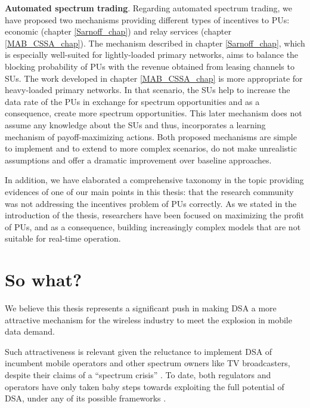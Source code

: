 \textbf{Automated spectrum trading}. Regarding automated spectrum trading, we have proposed two mechanisms providing different types of incentives to PUs: economic (chapter \ref{Sarnoff_chap}) and relay services (chapter \ref{MAB_CSSA_chap}). The mechanism described in chapter \ref{Sarnoff_chap}, which is especially well-suited for lightly-loaded primary networks, aims to balance the blocking probability of PUs with the revenue obtained from leasing channels to SUs. The work developed in chapter \ref{MAB_CSSA_chap} is more appropriate for heavy-loaded primary networks. In that scenario, the SUs help to increase the data rate of the PUs in exchange for spectrum opportunities and as a consequence, create more spectrum opportunities. This later mechanism does not assume any knowledge about the SUs and thus, incorporates a learning mechanism of payoff-maximizing actions. Both proposed mechanisms are simple to implement and to extend to more complex scenarios, do not make unrealistic assumptions and offer a dramatic improvement over baseline approaches. %

In addition, we have elaborated a comprehensive taxonomy in the topic providing evidences of one of our main points in this thesis: that the research community was not addressing the incentives problem of PUs correctly. As we stated in the introduction of the thesis, researchers have been focused on maximizing the profit of PUs, and as a consequence, building increasingly complex models that are not suitable for real-time operation.

\section{So what?} %
We believe this thesis represents a significant push in making DSA a more attractive mechanism for the wireless industry to meet the explosion in mobile data demand. 

Such attractiveness is relevant given the reluctance to implement DSA of incumbent mobile operators and other spectrum owners like TV broadcasters, despite their claims of a \enquote{spectrum crisis} \cite{Chen2012b}. To date, both regulators and operators have only taken baby steps towards exploiting the full potential of DSA, under any of its possible frameworks \cite{Nuechterlein2013, ref:Kelly2012}.

